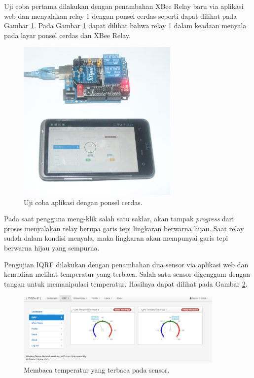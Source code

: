 			Uji coba pertama dilakukan dengan penambahan XBee Relay baru via aplikasi web dan menyalakan relay 1 dengan ponsel cerdas seperti dapat dilihat pada Gambar \ref{xbee-action}. Pada Gambar \ref{xbee-action} dapat dilihat bahwa relay 1 dalam keadaan menyala pada layar ponsel cerdas dan XBee Relay.

			\begin{figure}[H]
			  \centering
			    \includegraphics[width=0.7\textwidth]{gambar/xbee-action}
			    \caption{Uji coba aplikasi dengan ponsel cerdas.}
			    \label{xbee-action}
			\end{figure}

			Pada saat pengguna meng-klik salah satu saklar, akan tampak \emph{progress} dari proses menyalakan relay berupa garis tepi lingkaran berwarna hijau. Saat relay sudah dalam kondisi menyala, maka lingkaran akan mempunyai garis tepi berwarna hijau yang sempurna.

			Pengujian IQRF dilakukan dengan penambahan dua sensor via aplikasi web dan kemudian melihat temperatur yang terbaca. Salah satu sensor digenggam dengan tangan untuk memanipulasi temperatur. Hasilnya dapat dilihat pada Gambar \ref{screenshot-iqrf}.
			
			\begin{figure}[H]
			  \centering
			    \includegraphics[width=0.9\textwidth]{gambar/screenshot-iqrf}
			    \caption{Membaca temperatur yang terbaca pada sensor.}
			    \label{screenshot-iqrf}
			\end{figure}

